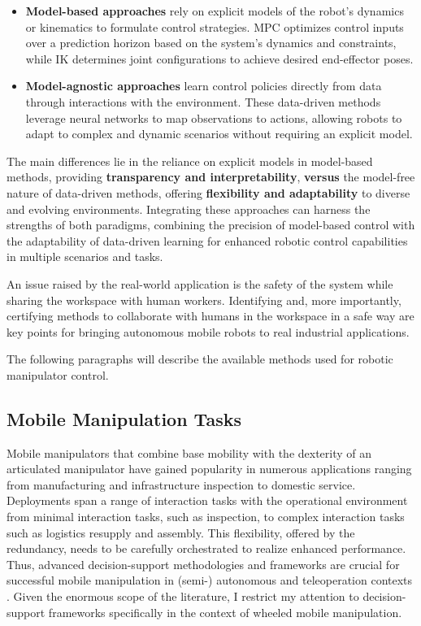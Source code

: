 \begin{itemize}
	\item \textbf{Model-based approaches} rely on explicit models of the robot's dynamics
	      or kinematics to formulate control strategies. MPC optimizes control inputs over a prediction
	      horizon based on the system's dynamics and constraints, while IK determines joint
	      configurations to achieve desired end-effector poses.
	\item \textbf{Model-agnostic approaches} learn control policies directly from data through
	      interactions with the environment. These data-driven methods leverage neural networks
	      to map observations to actions, allowing robots to adapt to complex and dynamic
	      scenarios without requiring an explicit model.
\end{itemize}

The main differences lie in the reliance on explicit models in model-based methods,
providing \textbf{transparency and interpretability}, \textbf{versus} the model-free nature of data-driven methods,
offering \textbf{flexibility and adaptability} to diverse and evolving environments.
Integrating these approaches can harness the strengths of both paradigms, combining the precision of
model-based control with the adaptability of data-driven learning for enhanced
robotic control capabilities in multiple scenarios and tasks.

An issue raised by the real-world application is the safety of the system while sharing
the workspace with human workers. Identifying and, more importantly, certifying methods
to collaborate with humans in the workspace in a safe way are key points for bringing autonomous
mobile robots to real industrial applications.

The following paragraphs will describe the available methods used for robotic manipulator control.

\subsection{Mobile Manipulation Tasks}

Mobile manipulators that combine base mobility with the dexterity of an articulated
manipulator have gained popularity in numerous applications ranging from manufacturing
and infrastructure inspection to domestic service. Deployments span a range of interaction
tasks with the operational environment from minimal interaction tasks, such as
inspection, to complex interaction tasks such as logistics resupply and assembly. This flexibility,
offered by the redundancy, needs to be carefully orchestrated to realize enhanced
performance. Thus, advanced decision-support methodologies and frameworks are
crucial for successful mobile manipulation in (semi-) autonomous and teleoperation
contexts \cite{thakar2023survey}. Given the enormous scope of the literature, I restrict my attention to decision-support
frameworks specifically in the context of wheeled mobile manipulation.

